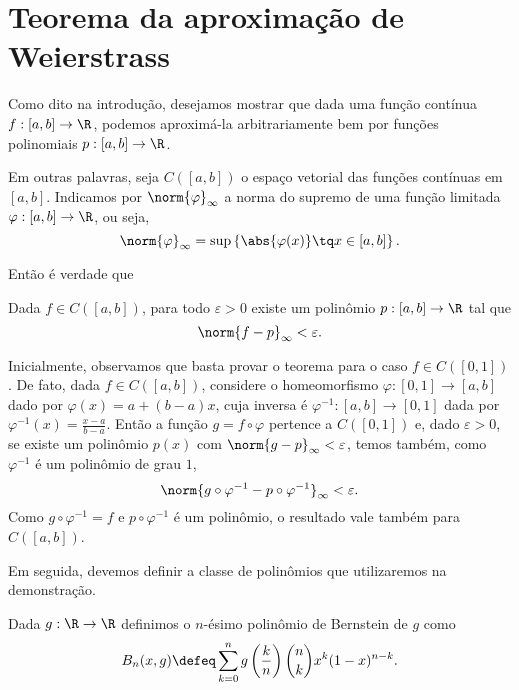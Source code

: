 
\section{Teorema da aproximação de Weierstrass}

Como dito na introdução, desejamos mostrar que dada uma função contínua \( f : [a, b] \to \R \), podemos aproximá-la arbitrariamente bem por funções polinomiais \( p : [a, b] \to \R \).

Em outras palavras, seja \( C( [a, b]) \) o espaço vetorial das funções contínuas em \( [a, b] \). Indicamos por \( \norm{ \varphi }_{ \infty } \) a norma do supremo de uma função limitada \( \varphi : [a, b] \to \R \), ou seja, \[
    \norm{ \varphi }_{ \infty } = \sup \left\{ \abs{ \varphi(x) } \tq x \in [a, b] \right\}
.\]

Então é verdade que

\begin{teo}
    \label{thm: weierstrass}
    Dada \( f \in C( [a, b] ) \), para todo \( \varepsilon > 0 \) existe um polinômio \( p : [a, b] \to \R \) tal que \[
        \norm{ f - p }_{ \infty } < \varepsilon
    .\]
\end{teo}

Inicialmente, observamos que basta provar o teorema para o caso \( f \in C([0, 1]) \).
De fato, dada \( f \in C([a, b]) \), considere o homeomorfismo \( \varphi : [0, 1] \to [a, b] \) dado por \( \varphi(x) = a + ( b - a )x \), cuja inversa é \( \varphi^{ -1 } : [a, b] \to [0, 1] \) dada por \( \varphi^{ -1 } (x) = \frac{ x - a }{ b - a } \).
Então a função \( g = f \circ \varphi \) pertence a \( C([0, 1]) \) e, dado \( \varepsilon > 0 \), se existe um polinômio \( p(x) \) com \( \norm{ g - p }_{ \infty } < \varepsilon \), temos também, como \( \varphi^{ -1 } \) é um polinômio de grau \( 1 \), \[
    \norm{ g \circ \varphi^{ -1 } - p \circ \varphi^{ -1 } }_{ \infty } < \varepsilon
.\]
Como \( g \circ \varphi^{ -1 } = f \) e \( p \circ \varphi^{ -1 } \) é um polinômio, o resultado vale também para \( C([a, b]) \).

Em seguida, devemos definir a classe de polinômios que utilizaremos na demonstração.

\begin{defn}
    \label{def: bernstein}
    Dada \( g : \R \to \R \) definimos o \( n \)-ésimo polinômio de Bernstein de \( g \) como
    \begin{equation}
        B_{ n }(x, g) \defeq
        \sum_{ k=0 }^{ n } g \left( \frac{ k }{ n } \right) \binom{n}{k} x^{ k } ( 1 - x )^{ n - k }
        \label{eq: bernstein}
    .\end{equation}
\end{defn}

